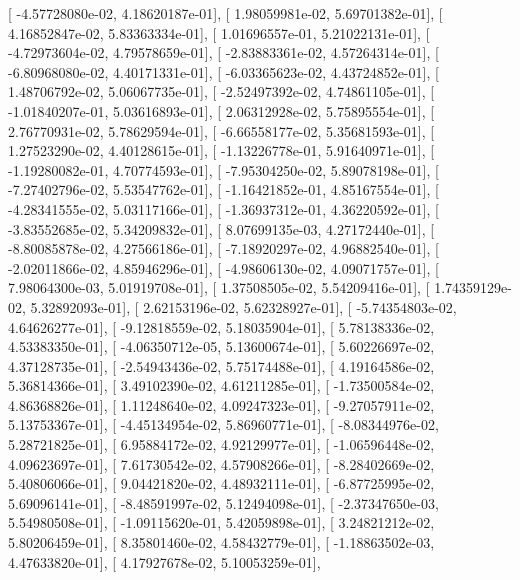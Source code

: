 \documentclass{article}
\begin{document}
       [ -4.57728080e-02,   4.18620187e-01],
       [  1.98059981e-02,   5.69701382e-01],
       [  4.16852847e-02,   5.83363334e-01],
       [  1.01696557e-01,   5.21022131e-01],
       [ -4.72973604e-02,   4.79578659e-01],
       [ -2.83883361e-02,   4.57264314e-01],
       [ -6.80968080e-02,   4.40171331e-01],
       [ -6.03365623e-02,   4.43724852e-01],
       [  1.48706792e-02,   5.06067735e-01],
       [ -2.52497392e-02,   4.74861105e-01],
       [ -1.01840207e-01,   5.03616893e-01],
       [  2.06312928e-02,   5.75895554e-01],
       [  2.76770931e-02,   5.78629594e-01],
       [ -6.66558177e-02,   5.35681593e-01],
       [  1.27523290e-02,   4.40128615e-01],
       [ -1.13226778e-01,   5.91640971e-01],
       [ -1.19280082e-01,   4.70774593e-01],
       [ -7.95304250e-02,   5.89078198e-01],
       [ -7.27402796e-02,   5.53547762e-01],
       [ -1.16421852e-01,   4.85167554e-01],
       [ -4.28341555e-02,   5.03117166e-01],
       [ -1.36937312e-01,   4.36220592e-01],
       [ -3.83552685e-02,   5.34209832e-01],
       [  8.07699135e-03,   4.27172440e-01],
       [ -8.80085878e-02,   4.27566186e-01],
       [ -7.18920297e-02,   4.96882540e-01],
       [ -2.02011866e-02,   4.85946296e-01],
       [ -4.98606130e-02,   4.09071757e-01],
       [  7.98064300e-03,   5.01919708e-01],
       [  1.37508505e-02,   5.54209416e-01],
       [  1.74359129e-02,   5.32892093e-01],
       [  2.62153196e-02,   5.62328927e-01],
       [ -5.74354803e-02,   4.64626277e-01],
       [ -9.12818559e-02,   5.18035904e-01],
       [  5.78138336e-02,   4.53383350e-01],
       [ -4.06350712e-05,   5.13600674e-01],
       [  5.60226697e-02,   4.37128735e-01],
       [ -2.54943436e-02,   5.75174488e-01],
       [  4.19164586e-02,   5.36814366e-01],
       [  3.49102390e-02,   4.61211285e-01],
       [ -1.73500584e-02,   4.86368826e-01],
       [  1.11248640e-02,   4.09247323e-01],
       [ -9.27057911e-02,   5.13753367e-01],
       [ -4.45134954e-02,   5.86960771e-01],
       [ -8.08344976e-02,   5.28721825e-01],
       [  6.95884172e-02,   4.92129977e-01],
       [ -1.06596448e-02,   4.09623697e-01],
       [  7.61730542e-02,   4.57908266e-01],
       [ -8.28402669e-02,   5.40806066e-01],
       [  9.04421820e-02,   4.48932111e-01],
       [ -6.87725995e-02,   5.69096141e-01],
       [ -8.48591997e-02,   5.12494098e-01],
       [ -2.37347650e-03,   5.54980508e-01],
       [ -1.09115620e-01,   5.42059898e-01],
       [  3.24821212e-02,   5.80206459e-01],
       [  8.35801460e-02,   4.58432779e-01],
       [ -1.18863502e-03,   4.47633820e-01],
       [  4.17927678e-02,   5.10053259e-01],
\end{document}
